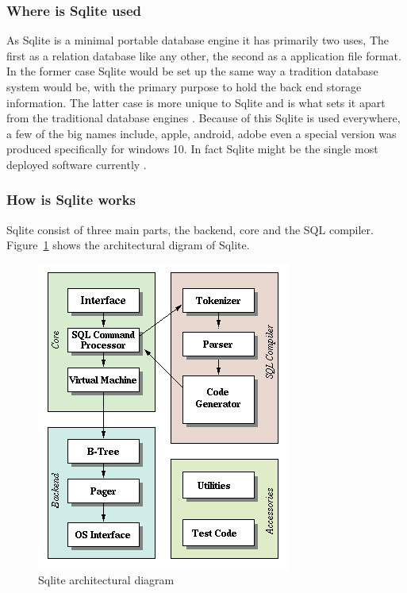 \subsubsection{Where is Sqlite used}
\label{subsubsec:where_is_sqlite}

As Sqlite is a minimal portable database engine it has primarily two uses, The first as a relation database like any other, the second as a application file format. In the former case Sqlite would be set up the same way a tradition database system would be, with the primary purpose to hold the back end storage information. The latter case is more unique to Sqlite and is what sets it apart from the traditional database engines \citep{sqlite}. Because of this Sqlite is used everywhere, a few of the big names include, apple, android, adobe even a special version was produced specifically for windows 10. In fact Sqlite might be the single most deployed software currently \citep{sqlite, sqlitetalk}.

\subsubsection{How is Sqlite works}
\label{subsubsec:how_sqlite_works}

Sqlite consist of three main parts, the backend, core and the SQL compiler. Figure~\ref{fig:sqlite_arch} shows the architectural digram of Sqlite.

\begin{figure}[H]
	\centering
	\includegraphics[scale=0.5]{images/sqlite_arch.png}
	\caption{Sqlite architectural diagram \citep{sqlite}}
	\label{fig:sqlite_arch}
\end{figure}

